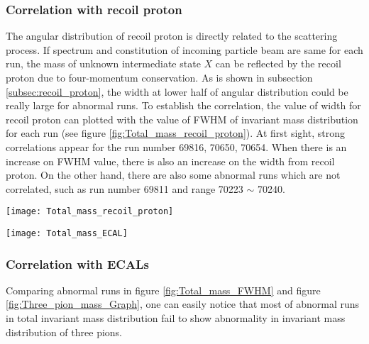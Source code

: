 \subsubsection{Correlation with recoil proton}
The angular distribution of recoil proton is directly related to the scattering process. If spectrum and constitution of incoming particle beam are same for each run, the mass of unknown intermediate state $X$ can be reflected by the recoil proton due to four-momentum conservation. As is shown in subsection \ref{subsec:recoil_proton}, the width at lower half of angular distribution could be really large for abnormal runs. To establish the correlation, the value of width for recoil proton can plotted with the value of FWHM of invariant mass distribution for each run (see figure \ref{fig:Total_mass_recoil_proton}). At first sight, strong correlations appear for the run number 69816, 70650, 70654. When there is an increase on FWHM value, there is also an increase on the width from recoil proton. On the other hand, there are also some abnormal runs which are not correlated, such as run number 69811 and range 70223 $\sim$ 70240.
\begin{figure*}[!h]
	\centering
	\vspace{2cm}
	\texttt{[image: Total\_mass\_recoil\_proton]}
	\caption{Histogram of invariant total mass distribution. The colors inside the histogram represent number of events corresponding to the run number and invariant mass. To better compare and conceive the structure of distribution between runs visually, the maximal value of each distribution is normalized to 1000. In the red dashed rectangles, it can be seen that the red strokes are much longer than the normal runs.}
	\label{fig:Total_mass_recoil_proton}
	\vspace{2 cm}
	
	\texttt{[image: Total\_mass\_ECAL]}
	\caption{Value of full width at half maximum of total invariant distribution for each run. Typical value of FWHM for normal run is around \SI{1.5}{\giga\electronvolt}.There are several outliners that have much bigger FWHM value than the general one. Also there is a range of runs 70223 $\sim$ 70240 that have slight smaller value of FWHM. }
	\label{fig:Total_mass_ECAL}
	\vspace{3cm}
\end{figure*}
\subsubsection{Correlation with ECALs}
Comparing abnormal runs in figure \ref{fig:Total_mass_FWHM} and figure \ref{fig:Three_pion_mass_Graph}, one can easily notice that most of abnormal runs in total invariant mass distribution fail to show abnormality in invariant mass distribution of three pions.
